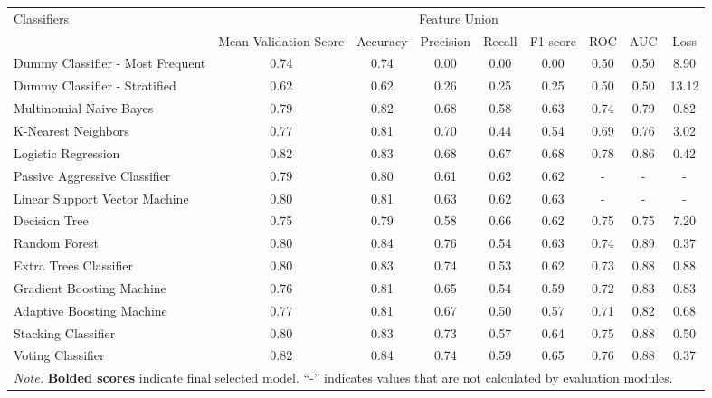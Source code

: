 \documentclass[jou]{apa7}
\begin{document}
\begin{landscape}
\begin{longtable}[l]{lcccccccc}
    \multirow{2}{*}{Classifiers} & \multicolumn{8}{c}{Feature Union} \\ \cline{2-9}
    & Mean   Validation Score & Accuracy & Precision & Recall & F1-score & ROC & AUC & Loss \\ \hline
    Dummy Classifier - Most   Frequent & 0.74 & 0.74 & 0.00 & 0.00 & 0.00 & 0.50 & 0.50 & 8.90 \\
    Dummy Classifier - Stratified & 0.62 & 0.62 & 0.26 & 0.25 & 0.25 & 0.50 & 0.50 & 13.12 \\
    Multinomial Naive Bayes & 0.79 & 0.82 & 0.68 & 0.58 & 0.63 & 0.74 & 0.79 & 0.82 \\
    K-Nearest Neighbors & 0.77 & 0.81 & 0.70 & 0.44 & 0.54 & 0.69 & 0.76 & 3.02 \\
    Logistic Regression & 0.82 & 0.83 & 0.68 & 0.67 & 0.68 & 0.78 & 0.86 & 0.42 \\
    Passive Aggressive Classifier & 0.79 & 0.80 & 0.61 & 0.62 & 0.62 & - & - & - \\
    Linear Support Vector Machine & 0.80 & 0.81 & 0.63 & 0.62 & 0.63 & - & - & - \\
    Decision Tree & 0.75 & 0.79 & 0.58 & 0.66 & 0.62 & 0.75 & 0.75 & 7.20 \\
    Random Forest & 0.80 & 0.84 & 0.76 & 0.54 & 0.63 & 0.74 & 0.89 & 0.37 \\
    Extra Trees Classifier & 0.80 & 0.83 & 0.74 & 0.53 & 0.62 & 0.73 & 0.88 & 0.88 \\
    Gradient Boosting Machine & 0.76 & 0.81 & 0.65 & 0.54 & 0.59 & 0.72 & 0.83 & 0.83 \\
    Adaptive Boosting Machine & 0.77 & 0.81 & 0.67 & 0.50 & 0.57 & 0.71 & 0.82 & 0.68 \\
    Stacking Classifier & 0.80 & 0.83 & 0.73 & 0.57 & 0.64 & 0.75 & 0.88 & 0.50 \\
    Voting Classifier & 0.82 & 0.84 & 0.74 & 0.59 & 0.65 & 0.76 & 0.88 & 0.37 \\ \hline
    \multicolumn{9}{l}{\textit{Note.} \textbf{Bolded scores} indicate final selected model. “-” indicates values that are not calculated by evaluation modules.}
    \end{longtable}
\end{landscape}
\end{document}
